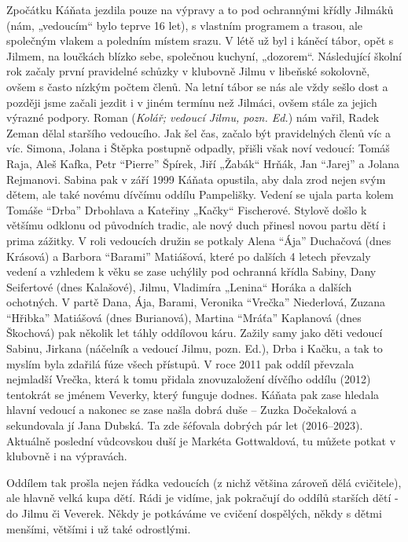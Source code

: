 Zpočátku Káňata jezdila pouze na výpravy a to pod ochrannými křídly
Jilmáků (nám, „vedoucím`` bylo teprve 16 let), s vlastním programem a
trasou, ale společným vlakem a poledním místem srazu. V létě už byl i
káněcí tábor, opět s Jilmem, na loučkách blízko sebe, společnou kuchyní,
„dozorem``. Následující školní rok začaly první pravidelné schůzky v
klubovně Jilmu v libeňské sokolovně, ovšem s často nízkým počtem členů.
Na letní tábor se nás ale vždy sešlo dost a později jsme začali jezdit i
v jiném termínu než Jilmáci, ovšem stále za jejich výrazné podpory.
Roman (\emph{Kolář; vedoucí Jilmu, pozn. Ed.}) nám vařil, Radek Zeman
dělal staršího vedoucího. Jak šel čas, začalo být pravidelných členů víc
a víc. Simona, Jolana i Štěpka postupně odpadly, přišli však noví
vedoucí: Tomáš Raja, Aleš Kafka, Petr ``Pierre'' Špírek, Jiří „Žabák``
Hrňák, Jan ``Jarej'' a Jolana Rejmanovi. Sabina pak v září 1999 Káňata
opustila, aby dala zrod nejen svým dětem, ale také novému dívčímu oddílu
Pampelišky. Vedení se ujala parta kolem Tomáše ``Drba'' Drbohlava a
Kateřiny „Kačky`` Fischerové. Stylově došlo k většímu odklonu od
původních tradic, ale nový duch přinesl novou partu dětí i prima
zážitky. V roli vedoucích družin se potkaly Alena ``Ája'' Duchačová
(dnes Krásová) a Barbora ``Barami'' Matiášová, které po dalších 4 letech
převzaly vedení a vzhledem k věku se zase uchýlily pod ochranná křídla
Sabiny, Dany Seifertové (dnes Kalašové), Jilmu, Vladimíra „Lenina``
Horáka a dalších ochotných. V partě Dana, Ája, Barami, Veronika
``Vrečka'' Niederlová, Zuzana ``Hřibka'' Matiášová (dnes Burianová),
Martina ``Mráťa'' Kaplanová (dnes Škochová) pak několik let táhly
oddílovou káru. Zažily samy jako děti vedoucí Sabinu, Jirkana (náčelník
a vedoucí Jilmu, pozn. Ed.), Drba i Kačku, a tak to myslím byla zdařilá
fúze všech přístupů. V roce 2011 pak oddíl převzala nejmladší Vrečka,
která k tomu přidala znovuzaložení dívčího oddílu (2012) tentokrát se
jménem Veverky, který funguje dodnes. Káňata pak zase hledala hlavní
vedoucí a nakonec se zase našla dobrá duše -- Zuzka Dočekalová a
sekundovala jí Jana Dubská. Ta zde šéfovala dobrých pár let
(2016--2023). Aktuálně poslední vůdcovskou duší je Markéta Gottwaldová,
tu můžete potkat v klubovně i na výpravách.

Oddílem tak prošla nejen řádka vedoucích (z nichž většina zároveň dělá
cvičitele), ale hlavně velká kupa dětí. Rádi je vidíme, jak pokračují do
oddílů starších dětí - do Jilmu či Veverek. Někdy je potkáváme ve
cvičení dospělých, někdy s dětmi menšími, většími i už také odrostlými.

